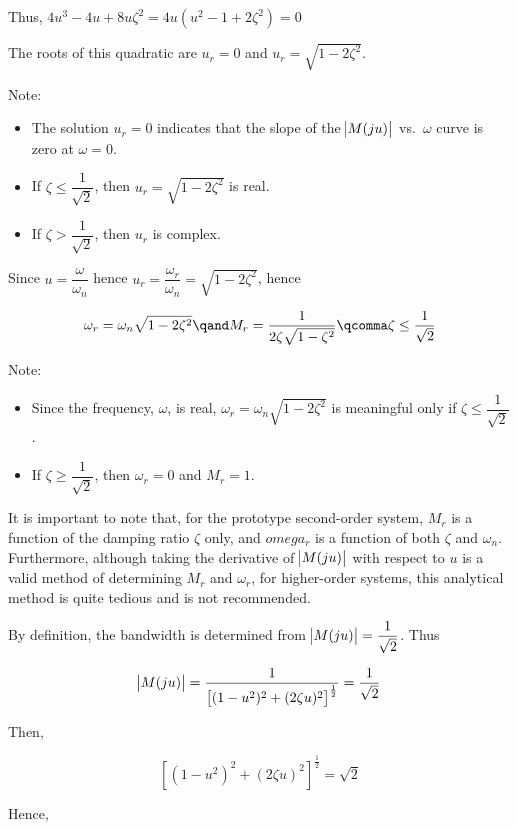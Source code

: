 \documentclass[
  14pt,
  a4paper,
  oneside,
  open=any,
  a4paper,
  14pt]{report}
\providecommand{\tightlist}{%
  \setlength{\itemsep}{0pt}\setlength{\parskip}{0pt}}\usepackage{longtable,booktabs,array}
\begin{document}
Thus, \(4u^3-4u+8u\zeta^2 = 4u(u^2-1+2\zeta^2) = 0\)

The roots of this quadratic are \(u_r = 0\) and
\(u_r = \sqrt{1-2\zeta^2}\).

Note:

\begin{itemize}
\tightlist
\item
  The solution \(u_r=0\) indicates that the slope of the \(\abs{M(ju)}\)
  vs.~\(\omega\) curve is zero at \(\omega =0\).
\item
  If \(\zeta \leq \dfrac{1}{\sqrt{2}}\), then
  \(u_r = \sqrt{1-2\zeta^2}\) is real.
\item
  If \(\zeta > \dfrac{1}{\sqrt{2}}\), then \(u_r\) is complex.
\end{itemize}

Since \(u=\dfrac{\omega}{\omega_n}\) hence
\(u_r= \dfrac{\omega_r}{\omega_n} = \sqrt{1-2\zeta^2}\), hence

\[
    \omega_r = \omega_n \sqrt{1-2\zeta^2} \qand M_r = \dfrac{1}{2\zeta\sqrt{1-\zeta^2}} \qcomma \zeta \leq \dfrac{1}{\sqrt{2}}
\]

Note:

\begin{itemize}
\tightlist
\item
  Since the frequency, \(\omega\), is real,
  \(\omega_r=\omega_n\sqrt{1-2\zeta^2}\) is meaningful only if
  \(\zeta \leq \dfrac{1}{\sqrt{2}}\).
\item
  If \(\zeta \geq \dfrac{1}{\sqrt{2}}\), then \(\omega_r = 0\) and
  \(M_r = 1\).
\end{itemize}

It is important to note that, for the prototype second-order system,
\(M_r\) is a function of the damping ratio \(\zeta\) only, and
\(omega_r\) is a function of both \(\zeta\) and \(\omega_n\).
Furthermore, although taking the derivative of \(\abs{M(ju)}\) with
respect to \(u\) is a valid method of determining \(M_r\) and
\(\omega_r\), for higher-order systems, this analytical method is quite
tedious and is not recommended.

By definition, the bandwidth is determined from
\(\abs{M(ju)} = \dfrac{1}{\sqrt{2}}\). Thus

\[
    \abs{M(ju)} = \dfrac{1}{\left[(1-u^2)^2 + (2\zeta u)^2 \right]^{\frac{1}{2}}} = \dfrac{1}{\sqrt{2}}
\]

Then,

\[
    \left[(1-u^2)^2 + (2\zeta u)^2 \right]^{\frac{1}{2}} = \sqrt{2}
\]

Hence,
\end{document}
